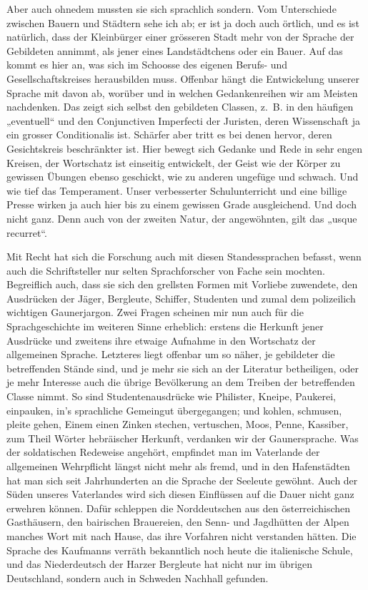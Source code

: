 {Aber auch ohnedem mussten sie sich sprachlich sondern. Vom Unterschiede zwischen Bauern und Städtern sehe ich ab; er ist ja doch auch örtlich, und es ist natürlich, dass der Kleinbürger einer grösseren Stadt mehr von der Sprache der Gebildeten annimmt, als jener eines Landstädtchens oder ein Bauer. Auf das kommt es hier an, was sich im Schoosse des eigenen Berufs- und Gesellschaftskreises herausbilden muss. Offenbar hängt die Entwickelung unserer Sprache mit davon ab, worüber und in welchen Gedankenreihen wir am Meisten nachdenken. Das zeigt sich selbst  den gebildeten Classen, z.~B. in den häufigen „eventuell“ und den Conjunctiven Imperfecti der Juristen, deren Wissenschaft ja ein grosser Conditionalis ist. Schärfer aber tritt es bei denen hervor, deren Gesichtskreis beschränkter ist. Hier bewegt sich Gedanke und Rede in sehr engen Kreisen, der Wortschatz ist einseitig entwickelt, der Geist wie der Körper zu gewissen Übungen ebenso geschickt, wie zu anderen ungefüge und schwach. Und wie tief  das Temperament. Unser verbesserter Schulunterricht und eine billige Presse wirken ja auch hier bis zu einem gewissen Grade ausgleichend. Und doch nicht ganz. Denn auch von der zweiten Natur, der angewöhnten, gilt das „usque recurret“.

Mit Recht hat sich die Forschung auch mit diesen Standessprachen \label{fp.283} befasst, wenn auch die Schriftsteller nur selten Sprachforscher von Fache sein mochten. \label{sp.289} Begreiflich auch, dass sie sich den grellsten Formen mit Vorliebe zuwendete, den Ausdrücken der Jäger, Bergleute, Schiffer, Studenten und zumal dem polizeilich wichtigen Gaunerjargon. Zwei Fragen scheinen mir nun auch für die Sprachgeschichte im weiteren Sinne erheblich: erstens die Herkunft jener Ausdrücke und zweitens ihre etwaige Aufnahme in den Wortschatz der allgemeinen Sprache. Letzteres liegt offenbar um so näher, je gebildeter die betreffenden Stände sind, und je mehr sie sich an der Literatur betheiligen, oder je mehr Interesse auch die übrige Bevölkerung an dem Treiben der betreffenden Classe nimmt. So sind Studentenausdrücke wie Philister, Kneipe, Paukerei, einpauken,  in’s sprachliche Gemeingut übergegangen; und kohlen, schmusen, pleite gehen, Einem einen Zinken stechen, vertuschen, Moos, Penne, Kassiber, zum Theil Wörter hebräischer Herkunft, verdanken wir der Gaunersprache. Was der soldatischen Redeweise angehört, empfindet man im Vaterlande der allgemeinen Wehrpflicht längst nicht mehr als fremd, und in den Hafenstädten hat man sich seit Jahrhunderten an die Sprache der Seeleute gewöhnt. Auch der Süden unseres Vaterlandes wird sich diesen Einflüssen auf die Dauer nicht ganz erwehren können. Dafür schleppen die Norddeutschen aus den österreichischen Gasthäusern, den bairischen Brauereien, den Senn- und Jagdhütten der Alpen manches Wort mit nach Hause, das ihre Vorfahren nicht verstanden hätten. Die Sprache des Kaufmanns verräth bekanntlich noch heute die italienische Schule, und das Niederdeutsch der Harzer Bergleute hat nicht nur im übrigen Deutschland, sondern auch in Schweden Nachhall gefunden.

}
